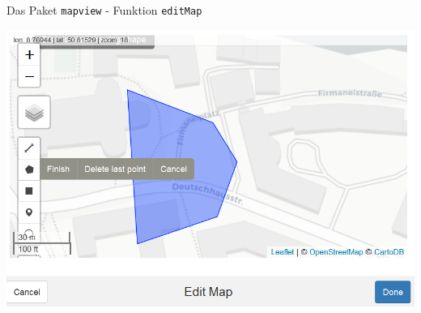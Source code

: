 \documentclass[ignorenonframetext,]{beamer}
\newenvironment{Shaded}{\begin{snugshade}}{\end{snugshade}}
\newcommand{\KeywordTok}[1]{\textcolor[rgb]{0.26,0.66,0.93}{\textbf{#1}}}
\newcommand{\NormalTok}[1]{\textcolor[rgb]{0.74,0.68,0.62}{#1}}
\newcommand{\OperatorTok}[1]{\textcolor[rgb]{0.74,0.68,0.62}{#1}}
\newcommand{\StringTok}[1]{\textcolor[rgb]{0.02,0.61,0.04}{#1}}
\begin{document}
\begin{frame}[fragile]{Das Paket \texttt{mapview} - Funktion
\texttt{editMap}}
\protect\hypertarget{das-paket-mapview---funktion-editmap}{}

\begin{Shaded}
\end{Shaded}

\includegraphics{figure/editmap.PNG}

\end{frame}
\end{document}

